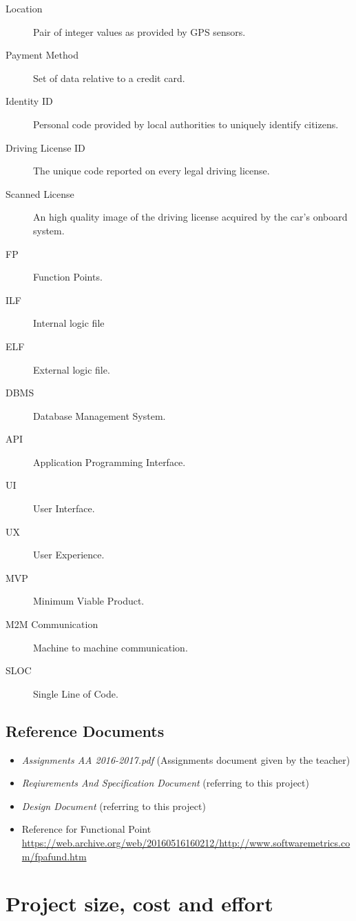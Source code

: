 \documentclass[11pt]{article} %
\begin{document}
\begin{description}
	\item[Location] Pair of integer values as provided by GPS sensors.
	\item[Payment Method] Set of data relative to a credit card.
	\item[Identity ID] Personal code provided by local authorities to uniquely identify citizens.
	\item[Driving License ID] The unique code reported on every legal driving license.
	\item[Scanned License] An high quality image of the driving license acquired by the car's onboard system.
	\item[FP] Function Points.
	\item[ILF] Internal logic file
	\item[ELF] External logic file.
	\item[DBMS] Database Management System.
	\item[API] Application Programming Interface.
	\item[UI] User Interface.
	\item[UX] User Experience.
	\item[MVP] Minimum Viable Product.
	\item[M2M Communication] Machine to machine communication.
	\item[SLOC] Single Line of Code.
  \end{description}

\subsection{Reference Documents}
\begin{itemize}
	\item \textit{Assignments AA 2016-2017.pdf} (Assignments document given by the teacher)
	\item \textit{Reqiurements And Specification Document} (referring to this project)
	\item \textit{Design Document} (referring to this project)
	\item	Reference for Functional Point \url{https://web.archive.org/web/20160516160212/http://www.softwaremetrics.com/fpafund.htm}
  \end{itemize}




\newpage
\section{Project size, cost and effort}
\end{document}
